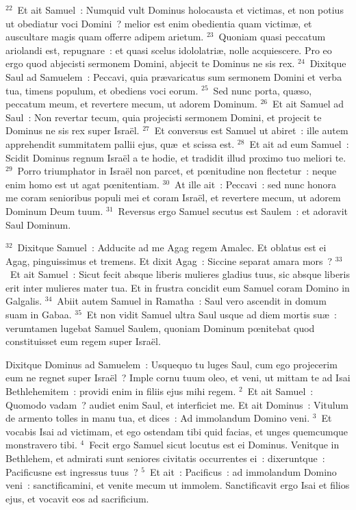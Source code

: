 ${}^{22}$~Et ait Samuel~: Numquid vult Dominus holocausta et victimas, et non potius ut obediatur voci Domini~? melior est enim obedientia quam victim\ae , et auscultare magis quam offerre adipem arietum.
${}^{23}$~Quoniam quasi peccatum ariolandi est, repugnare~: et quasi scelus idololatri\ae , nolle acquiescere. Pro eo ergo quod abjecisti sermonem Domini, abjecit te Dominus ne sis rex.
${}^{24}$~Dixitque Saul ad Samuelem~: Peccavi, quia pr\ae varicatus sum sermonem Domini et verba tua, timens populum, et obediens voci eorum.
${}^{25}$~Sed nunc porta, qu\ae so, peccatum meum, et revertere mecum, ut adorem Dominum.
${}^{26}$~Et ait Samuel ad Saul~: Non revertar tecum, quia projecisti sermonem Domini, et projecit te Dominus ne sis rex super Isra\"el.
${}^{27}$~Et conversus est Samuel ut abiret~: ille autem apprehendit summitatem pallii ejus, qu\ae\ et scissa est.
${}^{28}$~Et ait ad eum Samuel~: Scidit Dominus regnum Isra\"el a te hodie, et tradidit illud proximo tuo meliori te.
${}^{29}$~Porro triumphator in Isra\"el non parcet, et pœnitudine non flectetur~: neque enim homo est ut agat pœnitentiam.
${}^{30}$~At ille ait~: Peccavi~: sed nunc honora me coram senioribus populi mei et coram Isra\"el, et revertere mecum, ut adorem Dominum Deum tuum.
${}^{31}$~Reversus ergo Samuel secutus est Saulem~: et adoravit Saul Dominum.


${}^{32}$~Dixitque Samuel~: Adducite ad me Agag regem Amalec. Et oblatus est ei Agag, pinguissimus et tremens. Et dixit Agag~: Siccine separat amara mors~?
${}^{33}$~Et ait Samuel~: Sicut fecit absque liberis mulieres gladius tuus, sic absque liberis erit inter mulieres mater tua. Et in frustra concidit eum Samuel coram Domino in Galgalis.
${}^{34}$~Abiit autem Samuel in Ramatha~: Saul vero ascendit in domum suam in Gabaa.
${}^{35}$~Et non vidit Samuel ultra Saul usque ad diem mortis su\ae~: verumtamen lugebat Samuel Saulem, quoniam Dominum pœnitebat quod constituisset eum regem super Isra\"el.

\lettrine[lines=10,image=true,loversize=0.05,lraise=-0.03]{D}{}ixitque Dominus ad Samuelem~: Usquequo tu luges Saul, cum ego projecerim eum ne regnet super Isra\"el~? Imple cornu tuum oleo, et veni, ut mittam te ad Isai Bethlehemitem~: providi enim in filiis ejus mihi regem.
${}^{2}$~Et ait Samuel~: Quomodo vadam~? audiet enim Saul, et interficiet me. Et ait Dominus~: Vitulum de armento tolles in manu tua, et dices~: Ad immolandum Domino veni.
${}^{3}$~Et vocabis Isai ad victimam, et ego ostendam tibi quid facias, et unges quemcumque monstravero tibi.
${}^{4}$~Fecit ergo Samuel sicut locutus est ei Dominus. Venitque in Bethlehem, et admirati sunt seniores civitatis occurrentes ei~: dixeruntque~: Pacificusne est ingressus tuus~?
${}^{5}$~Et ait~: Pacificus~: ad immolandum Domino veni~: sanctificamini, et venite mecum ut immolem. Sanctificavit ergo Isai et filios ejus, et vocavit eos ad sacrificium.


